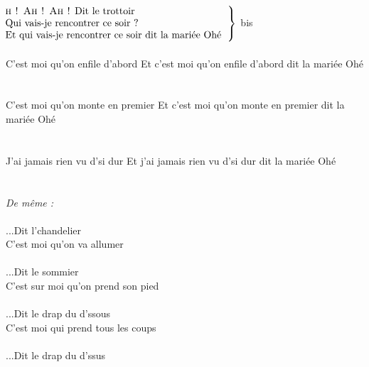 \\
~\\
$\left.\begin{tabular}{l}
\hspace{-0.4cm}
\textsc{h ! Ah ! Ah !} Dit le trottoir         
\\
\hspace{-0.4cm}
Qui vais-je rencontrer ce soir ?    
\\
\hspace{-0.4cm}
Et qui vais-je rencontrer ce soir dit la mariée Ohé
\end{tabular}\right\rbrace$ bis
\\~\\
{C'est moi qu'on enfile d'abord}
{Et c'est moi qu'on enfile d'abord dit la mariée Ohé}
\\\\~\\
{C'est moi qu'on monte en premier}
{Et c'est moi qu'on monte en premier dit la mariée Ohé}
\\\\~\\
{J'ai jamais rien vu d'si dur}
{Et j'ai jamais rien vu d'si dur dit la mariée Ohé}
\\\\~\\
\textit{De même :}
\\\\...Dit l'chandelier
\\C'est moi qu'on va allumer
\\\\...Dit le sommier
\\C'est sur moi qu'on prend son pied
\\\\...Dit le drap du d'ssous
\\C'est moi qui prend tous les coups
\\\\...Dit le drap du d'ssus
